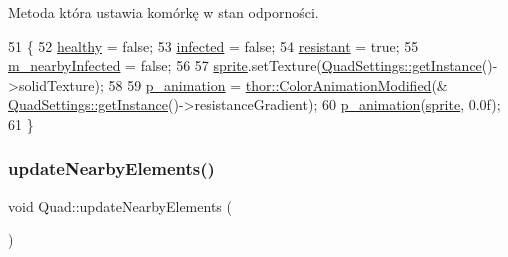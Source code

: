Metoda która ustawia komórkę w stan odporności. 
\begin{DoxyCode}
51 \{
52     \mbox{\hyperlink{class_quad_a4994c09af588aeb08c482ea46494a08c}{healthy}} = \textcolor{keyword}{false};
53     \mbox{\hyperlink{class_quad_ae439ca631a9f51147b9d84a9c9df49c4}{infected}} = \textcolor{keyword}{false};
54     \mbox{\hyperlink{class_quad_ae2197ad46a2d7e409b2ca9e7ac25a80c}{resistant}} = \textcolor{keyword}{true};
55     \mbox{\hyperlink{class_quad_a6ccb745d5e70603957948d681b60e0f8}{m\_nearbyInfected}} = \textcolor{keyword}{false};
56 
57     \mbox{\hyperlink{class_quad_a83667bb824c1d6eca6c9c8b6e6d07d06}{sprite}}.setTexture(\mbox{\hyperlink{class_quad_settings_a20d7cfd0c56c11adcdf75c5e3011de67}{QuadSettings::getInstance}}()->solidTexture);
58 
59     \mbox{\hyperlink{class_quad_ace5b5f07a650f624aeb07806bc34d3f6}{p\_animation}} = \mbox{\hyperlink{classthor_1_1_color_animation_modified}{thor::ColorAnimationModified}}(&
      \mbox{\hyperlink{class_quad_settings_a20d7cfd0c56c11adcdf75c5e3011de67}{QuadSettings::getInstance}}()->resistanceGradient);
60     \mbox{\hyperlink{class_quad_ace5b5f07a650f624aeb07806bc34d3f6}{p\_animation}}(\mbox{\hyperlink{class_quad_a83667bb824c1d6eca6c9c8b6e6d07d06}{sprite}}, 0.0f);
61 \}
\end{DoxyCode}
\mbox{\label{class_quad_a67483d3d113d177c0820f586a923e65e}} 
\subsubsection{\texorpdfstring{update\+Nearby\+Elements()}{updateNearbyElements()}}
{\footnotesize\ttfamily void Quad\+::update\+Nearby\+Elements (\begin{DoxyParamCaption}{ }\end{DoxyParamCaption})}

